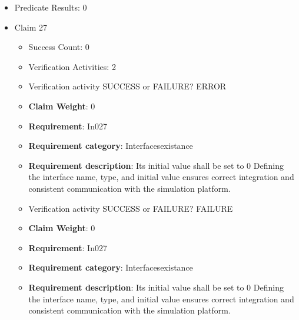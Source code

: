 \documentclass{article}
\begin{document}
\begin{itemize}
\begin{itemize}
					\item Verification activity SUCCESS or FAILURE? FAILURE
					\item \textbf{Claim Weight}: 0
						\item \textbf{Requirement}: In026 
						\item \textbf{Requirement category}: Interfacesexistance 
						\item \textbf{Requirement description}: Its initial value shall be set to 1 Defining the interface name, type, and initial value ensures correct integration and consistent communication with the simulation platform.
					
				\end{itemize}
				
									    
				\item Predicate Results: 0

  				  \item Claim 27
				\begin{itemize}
			    	\item Success Count: 0 
			    	\item Verification Activities: 2
					\item Verification activity SUCCESS or FAILURE? ERROR
					\item \textbf{Claim Weight}: 0
						\item \textbf{Requirement}: In027 
						\item \textbf{Requirement category}: Interfacesexistance 
						\item \textbf{Requirement description}: Its initial value shall be set to 0 Defining the interface name, type, and initial value ensures correct integration and consistent communication with the simulation platform.
					
					\item Verification activity SUCCESS or FAILURE? FAILURE
					\item \textbf{Claim Weight}: 0
						\item \textbf{Requirement}: In027 
						\item \textbf{Requirement category}: Interfacesexistance 
						\item \textbf{Requirement description}: Its initial value shall be set to 0 Defining the interface name, type, and initial value ensures correct integration and consistent communication with the simulation platform.
					
				\end{itemize}
				

\end{itemize}
\end{document}
